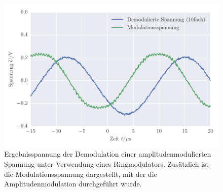 
\FloatBarrier\begin{figure}[!h]
\centering
\includegraphics[scale=1]{../Grafiken/Amplituden_Modulation_Ring_Demodulation.pdf}
\caption{Ergebnisspannung der Demodulation einer amplitudenmodulierten Spannung unter
	Verwendung eines Ringmodulators. Zusätzlich ist die Modulationsspannung dargestellt,
	mit der die Amplitudenmodulation durchgeführt wurde.
	\label{fig:amplituden_modulation_ring_demodulation}}
\end{figure}
\FloatBarrier